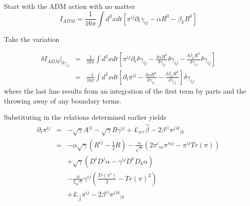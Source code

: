 \documentclass[12pt]{article}
\begin{document}
Start with the ADM action with no matter
\begin{equation}\label{VA3G_1}
I_{ADM} = \frac{1}{16 \pi} \int d^3x dt \left[ {\pi}^{i j} \partial_{t} {\gamma}_{i j} - \alpha R^0 - \beta_{k} R^{k} \right]
\end{equation}

Take the variation

\begin{eqnarray}\label{VA3G_2}
{ \delta I_{ADM} } |_{\delta {\gamma}_{i j} } & = & \frac{1}{16 \pi} \int d^3x dt \left[
{\pi}^{i j} \partial_{t} \delta {\gamma}_{i j}
- \frac{\delta \alpha R^0}{\delta {\gamma}_{i j}} \delta {\gamma}_{i j}
- \frac{\delta \beta_{k} R^{k}}{\delta {\gamma}_{i j}} \delta {\gamma}_{i j} \right]
\nonumber \\
& = & \frac{-1}{16 \pi} \int d^3x dt \left[
\partial_{t} {\pi}^{i j}
- \frac{\delta \alpha R^0}{\delta {\gamma}_{i j}}
- \frac{\delta \beta_{k} R^{k}}{\delta {\gamma}_{i j}} \right] \delta {\gamma}_{i j}
\end{eqnarray}
where the last line results from an integration of the first term by parts
and the throwing away of any boundary terms.

Substituting in the relations determined earlier yields
\begin{eqnarray}\label{VA3G_3}
\partial_{t} {\pi}^{i j} & = & - \sqrt{\gamma} { A } ^ { ij }
- \sqrt{\gamma} B {\gamma}^{i j}
+ \pounds_{{\pi}^{i j}} {\vec \beta}
- 2 {\beta}^{(i} { {\pi}^{j) k} } _ { |k } \nonumber \\
& = & - \alpha \sqrt{\gamma} \left( R^{i j} - \frac{1}{2} R \right)
- \frac{ \alpha }{ \sqrt{\gamma} } \left( 2 {\pi^i}_{m} {\pi}^{m j}
- {\pi}^{i j} Tr( \pi ) \right) \nonumber \\
&   & + \sqrt{\gamma} \left( D^{i} D^{j} \alpha
- {\gamma}^{i j} D^{k} D_{k} \alpha \right) \nonumber \\
&   & - \frac{ \alpha }{ 2 \sqrt{\gamma} } {\gamma}^{i j}
\left( \frac{Tr( \pi ^2 )}{2} - Tr( \pi ) ^2 \right) \nonumber \\
&   & + \pounds_{{\vec \beta}} {\pi}^{i j}
- 2 {\beta}^{(i} { {\pi}^{j) k} } _ { |k }
\end{eqnarray}
\end{document}
